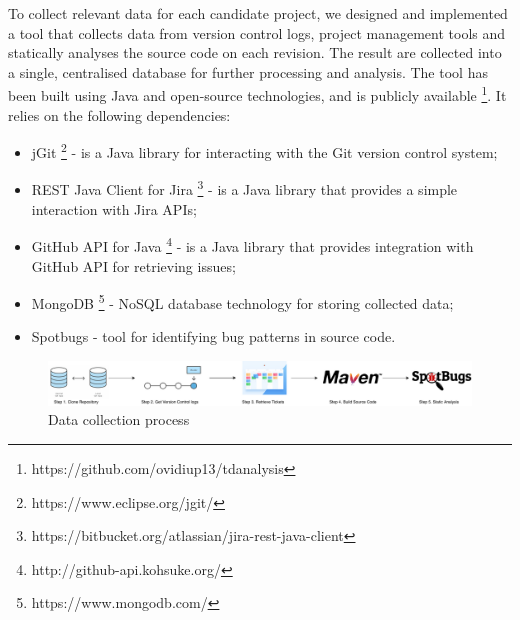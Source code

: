 \documentclass{mpaper}
\begin{document}
To collect relevant data for each candidate project, we designed and implemented
a tool that collects data from version control logs, project management tools
and statically analyses the source code on each revision. The result are
collected into a single, centralised database for further processing and
analysis. The tool has been built using Java and open-source technologies, and
is publicly available \footnote{https://github.com/ovidiup13/tdanalysis}. It
relies on the following dependencies:

\begin{itemize}
  \item jGit \footnote{https://www.eclipse.org/jgit/} - is a Java library for
  interacting with the Git version control system;
  \item REST Java Client for Jira
  \footnote{https://bitbucket.org/atlassian/jira-rest-java-client} - is a Java
  library that provides a simple interaction with Jira APIs;
  \item GitHub API for Java \footnote{http://github-api.kohsuke.org/} - is a
  Java library that provides integration with GitHub API for retrieving issues;
  \item MongoDB \footnote{https://www.mongodb.com/} - NoSQL database technology
  for storing collected data;
  \item Spotbugs - tool for identifying bug patterns in source code.
\end{itemize}

\begin{figure}[ht]
	\centering
	\includegraphics[width=\linewidth]{diagrams/collection-pipeline.pdf}
	\caption{Data collection process}
	\label{fig:data-collection}
\end{figure}
\end{document}
